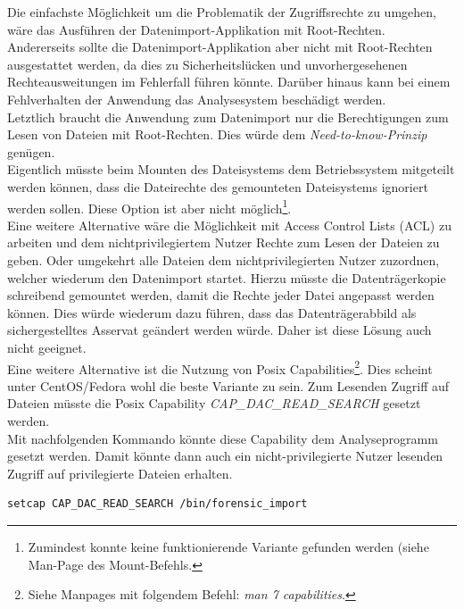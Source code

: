 \noindent
Die einfachste Möglichkeit um die Problematik der Zugriffsrechte zu umgehen, wäre das Ausführen der Datenimport-Applikation mit Root-Rechten. Andererseits sollte die Datenimport-Applikation aber nicht mit Root-Rechten ausgestattet werden, da dies zu Sicherheitslücken und unvorhergesehenen Rechteausweitungen im Fehlerfall führen könnte. Darüber hinaus kann bei einem Fehlverhalten der Anwendung das Analysesystem beschädigt werden. \\
Letztlich braucht die Anwendung zum Datenimport nur die Berechtigungen zum Lesen von Dateien mit Root-Rechten. Dies würde dem \textit{Need-to-know-Prinzip} genügen.\\

\noindent
Eigentlich müsste beim Mounten des Dateisystems dem Betriebssystem mitgeteilt werden können, dass die Dateirechte des gemounteten Dateisystems ignoriert werden sollen. Diese Option ist aber nicht möglich\footnote{Zumindest konnte keine funktionierende Variante gefunden werden (siehe Man-Page des Mount-Befehls.}.\\
Eine weitere Alternative wäre die Möglichkeit mit Access Control Lists (ACL) zu arbeiten und dem nichtprivilegiertem Nutzer Rechte zum Lesen der Dateien zu geben. Oder umgekehrt alle Dateien dem nichtprivilegierten Nutzer zuzordnen, welcher wiederum den Datenimport startet.
Hierzu müsste die Datenträgerkopie schreibend gemountet werden, damit die Rechte jeder Datei angepasst werden können. Dies würde wiederum dazu führen, dass das Datenträgerabbild als sichergestelltes Asservat geändert werden würde. 
Daher ist diese Lösung auch nicht geeignet.\\

\noindent
Eine weitere Alternative ist die Nutzung von Posix Capabilities\footnote{Siehe Manpages mit folgendem Befehl: \textit{ man 7 capabilities}.}.
Dies scheint unter CentOS/Fedora wohl die beste Variante zu sein. Zum Lesenden Zugriff auf Dateien müsste die Posix Capability \textit{CAP\_DAC\_READ\_SEARCH} gesetzt werden.\\
Mit nachfolgenden Kommando könnte diese Capability dem Analyseprogramm gesetzt werden.
Damit könnte dann auch ein nicht-privilegierte Nutzer lesenden Zugriff auf privilegierte Dateien erhalten.\\ 

\begin{lstlisting}[label={lst:pos_cap_command},caption= Befehl zum Setzen von Posix Capabilities,captionpos=b,frame=single,style=customshell]
setcap CAP_DAC_READ_SEARCH /bin/forensic_import
\end{lstlisting}

